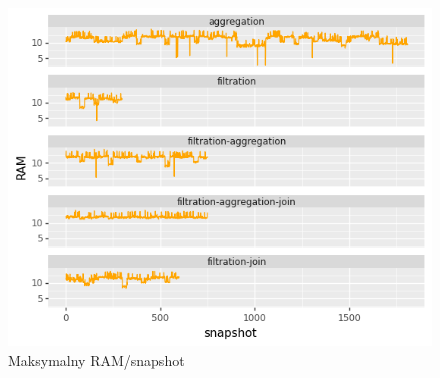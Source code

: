 \begin{figure}[H]
    \centering
    \captionsetup{justification=centering,margin=0.5cm}
    \includegraphics[scale=1.0]{figures/04-opis-danych/data-analysis/all_max_ram.png}
    \caption{Maksymalny RAM/snapshot}
    \label{fig:scr46}
\end{figure}

